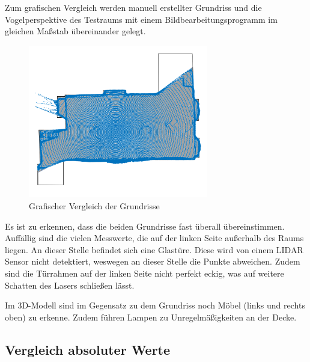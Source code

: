 Zum grafischen Vergleich werden manuell erstellter Grundriss und die Vogelperspektive des Testraums mit einem Bildbearbeitungsprogramm im gleichen Maßstab übereinander gelegt.

\begin{figure}[H]
	\centering
	\includegraphics[width=0.7\textwidth]{images/Validierung/uebereinander}
	\caption{Grafischer Vergleich der Grundrisse}
	\label{uebereinander}
\end{figure}


Es ist zu erkennen, dass die beiden Grundrisse fast überall übereinstimmen. Auffällig sind die vielen Messwerte, die auf der linken Seite außerhalb des Raums liegen. An dieser Stelle befindet sich eine Glastüre. Diese wird von einem \ac{LIDAR} Sensor nicht detektiert, weswegen an dieser Stelle die Punkte abweichen. Zudem sind die Türrahmen auf der linken Seite nicht perfekt eckig, was auf weitere Schatten des Lasers schließen lässt.

Im 3D-Modell sind im Gegensatz zu dem Grundriss noch Möbel (links und rechts oben) zu erkenne. Zudem führen Lampen zu Unregelmäßigkeiten an der Decke.


\subsection{Vergleich absoluter Werte}


